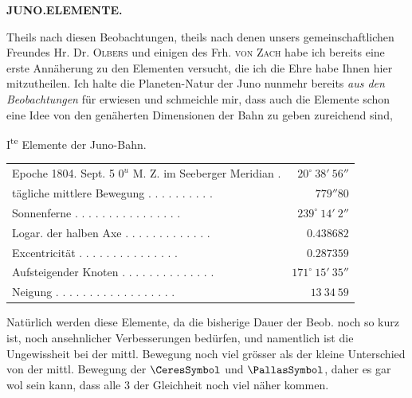 \clearpage
\thispagestyle{empty}
\noindent{}%
\makebox[12mm][l]{}%
\parbox[t]{\dimexpr\linewidth-24mm\relax}{\centering\footnotesize\bfseries JUNO.\enspace ELEMENTE.\par}%
\par\nobreak\medskip
\par\indent Theils nach diesen Beobachtungen, theils nach denen unsers gemeinschaftlichen Freundes
Hr. Dr. \textsc{Olbers} und einigen des Frh. \textsc{von Zach} habe ich bereits eine erste Annäherung zu
den Elementen versucht, die ich die Ehre habe Ihnen hier mitzutheilen. Ich halte die
Planeten-Natur der Juno nunmehr bereits \emph{aus den Beobachtungen} für erwiesen und
schmeichle mir, dass auch die Elemente schon eine Idee von den genäherten Dimensionen
der Bahn zu geben zureichend sind,

\begin{center}
I\textsuperscript{te} Elemente der Juno-Bahn.
\end{center}

\begin{center}
\begingroup\fontsize{8}{10}\selectfont\setlength{\tabcolsep}{3pt}
\begin{tabular}{lr}
Epoche 1804. Sept. 5 $0^u$ M. Z. im Seeberger Meridian . & $20^\circ\ 38'\ 56''$ \\
tägliche mittlere Bewegung . . . . . . . . . . & $779''80$ \\
Sonnenferne . . . . . . . . . . . . . . . . & $239^\circ\ 14'\ 2''$ \\
Logar. der halben Axe . . . . . . . . . . . . . & $0.438682$ \\
Excentricität . . . . . . . . . . . . . . . & $0.287359$ \\
Aufsteigender Knoten . . . . . . . . . . . . . . & $171^\circ\ 15'\ 35''$ \\
Neigung . . . . . . . . . . . . . . . . . . & $13\ 34\ 59$ \\
\end{tabular}\endgroup
\end{center}

Natürlich werden diese Elemente, da die bisherige Dauer der Beob. noch so kurz ist,
noch ansehnlicher Verbesserungen bedürfen, und namentlich ist die Ungewissheit bei der
mittl. Bewegung noch viel grösser als der kleine Unterschied von der mittl. Bewegung der
$\CeresSymbol$ und $\PallasSymbol$, daher es gar wol sein kann, dass alle 3 der Gleichheit noch viel näher kommen.

